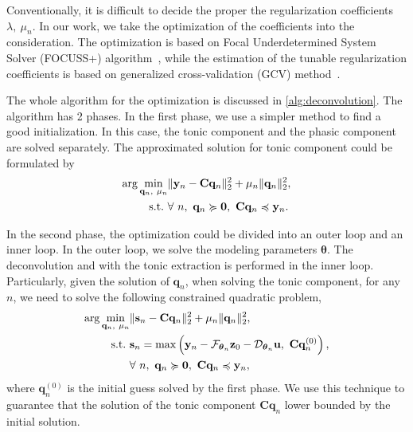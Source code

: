 \documentclass[10pt,conference]{ieeeconf}
\begin{document}
Conventionally, it is difficult to decide the proper the regularization coefficients $\lambda,~\mu_n$. In our work, we take the optimization of the coefficients into the consideration. The optimization is based on Focal Underdetermined System Solver (FOCUSS+) algorithm~\cite{murray2005visual}, while the estimation of the tunable regularization coefficients is based on  generalized cross-validation (GCV) method~\cite{zdunek2008improved}. 

The whole algorithm for the optimization is discussed in \cref{alg:deconvolution}. The algorithm has 2 phases. In the first phase, we use a simpler method to find a good initialization. In this case, the tonic component and the phasic component are solved separately. The approximated solution for tonic component could be formulated by
\begin{subequations} \label{fml:the:firststage}
  \renewcommand{\theequation}
  {\theparentequation-\arabic{equation}}
  \begin{align}
  \arg \min\limits_{\mathbf{q}_n,~\mu_n} & \lVert \mathbf{y}_n - \mathbf{C} \mathbf{q}_n \rVert^2_2 + \mu_n \lVert \mathbf{q}_n \rVert_2^2, \\
  \mathrm{s.t.}~& \forall~n,~\mathbf{q}_n \succcurlyeq \mathbf{0},~\mathbf{C}\mathbf{q}_n \preccurlyeq \mathbf{y}_n.
  \end{align}
\end{subequations}

In the second phase, the optimization could be divided into an outer loop and an inner loop. In the outer loop, we solve the modeling parameters $\boldsymbol{\theta}$. The deconvolution and with the tonic extraction is performed in the inner loop. Particularly, given the solution of $\mathbf{q}_n$, when solving the tonic component, for any $n$, we need to solve the following constrained quadratic problem,
\begin{subequations} \label{fml:the:second-tonic}
  \renewcommand{\theequation}
  {\theparentequation-\arabic{equation}}
  \begin{align}
  \arg \min\limits_{\mathbf{q}_n,~\mu_n} & \lVert \mathbf{s}_n - \mathbf{C} \mathbf{q}_n \rVert^2_2 + \mu_n \lVert \mathbf{q}_n \rVert_2^2, \\
  \mathrm{s.t.}~& \mathbf{s}_n = \max\left( \mathbf{y}_n - \mathcal{F}_{\boldsymbol{\theta}_n} \mathbf{z}_{0} - \mathcal{D}_{\boldsymbol{\theta}_n} \mathbf{u},~\mathbf{C} \mathbf{q}^{(0)}_n \right), \label{fml:the:second-tonic-obj}\\
  & \forall~n,~\mathbf{q}_n \succcurlyeq \mathbf{0},~\mathbf{C}\mathbf{q}_n \preccurlyeq \mathbf{y}_n,
  \end{align}
\end{subequations}
%
where $\mathbf{q}^{(0)}_n$ is the initial guess solved by the first phase. We use this technique to guarantee that the solution of the tonic component $\mathbf{C} \mathbf{q}_n$ lower bounded by the initial solution.
\end{document}

